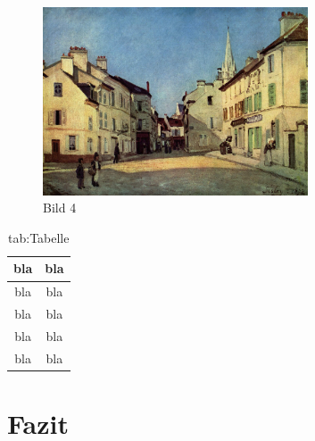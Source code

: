 \documentclass[
	A4paper,
	DIV=9,
	BCOR7mm,
	smallheadings,
	headinclude,
	footinclude,
	headsepline,
	parindent,
	german,
	captions=tableheading,
	abstracton
	]{scrreprt}
\begin{document}
\blindtext[2]{}\autocite{:Geschwinde_Rauschdrogen}
\begin{figure}[htbp]
\begin{center}
\includegraphics[width=0.7\textwidth]{Abbildungen/Bild4.jpg}
\caption{Bild 4}
\label{fig:Bild4}
\end{center}
\end{figure}

\blindtext[1]{}
\begin{table}[]
\caption{tab:Tabelle}
\begin{center}
\begin{tabular}{|c|c|}
\hline
bla & bla \\
\hline
\hline
bla & bla \\
bla & bla \\
bla & bla \\
bla & bla \\
\hline
\end{tabular}
\end{center}
\label{default}
\end{table}%

\chapter{Fazit}
\blindtext[1]{}

\blindtext[2]{}

\blindtext[2]{}

\blindtext[1]{}

\printbibliography
\end{document}
